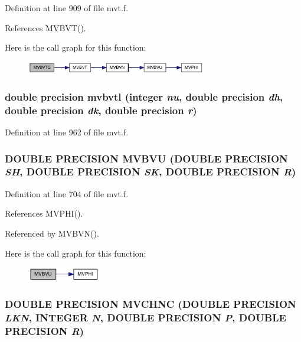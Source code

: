 Definition at line 909 of file mvt.f.

References MVBVT().

Here is the call graph for this function:\nopagebreak
\begin{figure}[H]
\begin{center}
\leavevmode
\includegraphics[width=223pt]{mvt_8f_597ed59b5410765b8afcc6527c9552e7_cgraph}
\end{center}
\end{figure}
\hypertarget{mvt_8f_9194afe3b3514326417468c9e9f43f0e}{
\subsubsection[{mvbvtl}]{\setlength{\rightskip}{0pt plus 5cm}double precision mvbvtl (integer {\em nu}, \/  double precision {\em dh}, \/  double precision {\em dk}, \/  double precision {\em r})}}
\label{mvt_8f_9194afe3b3514326417468c9e9f43f0e}




Definition at line 962 of file mvt.f.\hypertarget{mvt_8f_151b69372f580727b65189d3ba4c08e4}{
\subsubsection[{MVBVU}]{\setlength{\rightskip}{0pt plus 5cm}DOUBLE PRECISION MVBVU (DOUBLE PRECISION {\em SH}, \/  DOUBLE PRECISION {\em SK}, \/  DOUBLE PRECISION {\em R})}}
\label{mvt_8f_151b69372f580727b65189d3ba4c08e4}




Definition at line 704 of file mvt.f.

References MVPHI().

Referenced by MVBVN().

Here is the call graph for this function:\nopagebreak
\begin{figure}[H]
\begin{center}
\leavevmode
\includegraphics[width=90pt]{mvt_8f_151b69372f580727b65189d3ba4c08e4_cgraph}
\end{center}
\end{figure}
\hypertarget{mvt_8f_81b566eaa4178de04b31e15475cde3bf}{
\subsubsection[{MVCHNC}]{\setlength{\rightskip}{0pt plus 5cm}DOUBLE PRECISION MVCHNC (DOUBLE PRECISION {\em LKN}, \/  INTEGER {\em N}, \/  DOUBLE PRECISION {\em P}, \/  DOUBLE PRECISION {\em R})}}
\label{mvt_8f_81b566eaa4178de04b31e15475cde3bf}




